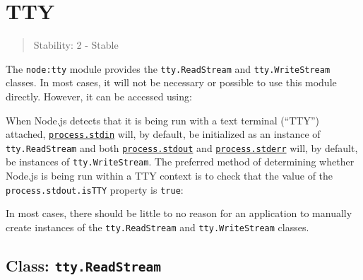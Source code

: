 \section{TTY}\label{tty}

\begin{quote}
Stability: 2 - Stable
\end{quote}

The \texttt{node:tty} module provides the \texttt{tty.ReadStream} and
\texttt{tty.WriteStream} classes. In most cases, it will not be
necessary or possible to use this module directly. However, it can be
accessed using:

\begin{Shaded}
\begin{Highlighting}[]
\OperatorTok{=} \NormalTok{(}\NormalTok{)}\OperatorTok{;}
\end{Highlighting}
\end{Shaded}

When Node.js detects that it is being run with a text terminal (``TTY'')
attached, \href{process.md\#processstdin}{\texttt{process.stdin}} will,
by default, be initialized as an instance of \texttt{tty.ReadStream} and
both \href{process.md\#processstdout}{\texttt{process.stdout}} and
\href{process.md\#processstderr}{\texttt{process.stderr}} will, by
default, be instances of \texttt{tty.WriteStream}. The preferred method
of determining whether Node.js is being run within a TTY context is to
check that the value of the \texttt{process.stdout.isTTY} property is
\texttt{true}:

\begin{Shaded}
\begin{Highlighting}[]
\end{Highlighting}
\end{Shaded}

In most cases, there should be little to no reason for an application to
manually create instances of the \texttt{tty.ReadStream} and
\texttt{tty.WriteStream} classes.

\subsection{\texorpdfstring{Class:
\texttt{tty.ReadStream}}{Class: tty.ReadStream}}\label{class-tty.readstream}


